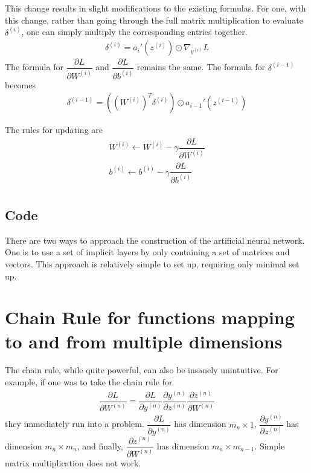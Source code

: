 \documentclass{article}
\begin{document}
	This change results in slight modifications to the existing formulas. For one, with this change, rather than going through the full matrix multiplication to evaluate \( \delta^{(i)} \), one can simply multiply the corresponding entries together.
	\begin{gather*}
		\delta^{(i)} = a_{i}'(z^{(i)}) \odot \nabla_{y^{(i)}}L
	\end{gather*}
 	The formula for \( \dfrac{\partial L}{\partial W^{(i)}} \) and \( \dfrac{\partial L}{\partial b^{(i)}} \) remains the same. The formula for \( \delta^{(i - 1)} \) becomes
 	\begin{gather*}
 		\delta^{(i - 1)} = \left( \left( W^{(i)} \right)^T \delta^{(i)} \right) \odot a_{i - 1}'(z^{(i - 1)})
 	\end{gather*}
 	
 	The rules for updating are
 	\begin{gather*}
 		W^{(i)} \leftarrow W^{(i)} - \gamma \dfrac{\partial L}{\partial W^{(i)}} \\
 		b^{(i)} \leftarrow b^{(i)} - \gamma \dfrac{\partial L}{\partial b^{(i)}} \\
 	\end{gather*}
 	
 	\subsection{Code}
 	
 	There are two ways to approach the construction of the artificial neural network. One is to use a set of implicit layers by only containing a set of matrices and vectors. This approach is relatively simple to set up, requiring only minimal set up.
 	 	
 	\appendix
 	
 	\section{Chain Rule for functions mapping to and from multiple dimensions}
 	The chain rule, while quite powerful, can also be insanely unintuitive. For example, if one was to take the chain rule for
 	\begin{gather*}
 		\dfrac{\partial L}{\partial W^{(n)}} = \dfrac{\partial L}{\partial y^{(n)}} \dfrac{\partial y^{(n)}}{\partial z^{(n)}} \dfrac{\partial z^{(n)}}{\partial W^{(n)}}
 	\end{gather*}
 	they immediately run into a problem. \( \dfrac{\partial L}{\partial y^{(n)}} \) has  dimension \( m_{n} \times 1\), \( \dfrac{\partial y^{(n)}}{\partial z^{(n)}} \) has dimension \( m_{n} \times m_{n}\), and finally, \( \dfrac{\partial z^{(n)}}{\partial W^{(n)}} \) has dimension \( m_{n} \times m_{n - 1}\). Simple matrix multiplication does not work.
 	
\end{document}
